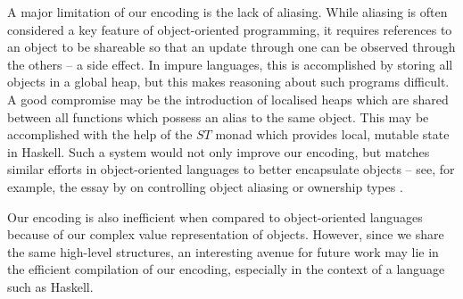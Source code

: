 A major limitation of our encoding is the lack of aliasing. While aliasing is often considered a key feature of object-oriented programming, it requires references to an object to be shareable so that an update through one can be observed through the others -- a side effect. In impure languages, this is accomplished by storing all objects in a global heap, but this makes reasoning about such programs difficult. A good compromise may be the introduction of localised heaps which are shared between all functions which possess an alias to the same object. This may be accomplished with the help of the $\mathit{ST}$ monad \cite{launchbury1995state} which provides local, mutable state in Haskell. Such a system would not only improve our encoding, but matches similar efforts in object-oriented languages to better encapsulate objects -- see, for example, the essay by \citet{hogg1992geneva} on controlling object aliasing or ownership types \cite{clarke1998ownership}.

Our encoding is also inefficient when compared to object-oriented languages because of our complex value representation of objects. However, since we share the same high-level structures, an interesting avenue for future work may lie in the efficient compilation of our encoding, especially in the context of a language such as Haskell. 

